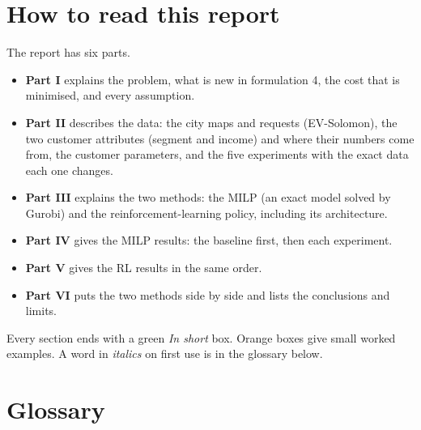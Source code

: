 \section{How to read this report}

The report has six parts.
\begin{itemize}
  \item \textbf{Part I} explains the problem, what is new in formulation 4, the cost that is minimised, and every assumption.
  \item \textbf{Part II} describes the data: the city maps and requests (EV-Solomon), the two customer attributes (segment and income) and where their numbers come from, the customer parameters, and the five experiments with the exact data each one changes.
  \item \textbf{Part III} explains the two methods: the MILP (an exact model solved by Gurobi) and the reinforcement-learning policy, including its architecture.
  \item \textbf{Part IV} gives the MILP results: the baseline first, then each experiment.
  \item \textbf{Part V} gives the RL results in the same order.
  \item \textbf{Part VI} puts the two methods side by side and lists the conclusions and limits.
\end{itemize}
Every section ends with a green \emph{In short} box. Orange boxes give small worked examples. A word in \emph{italics} on first use is in the glossary below.

\section{Glossary}

